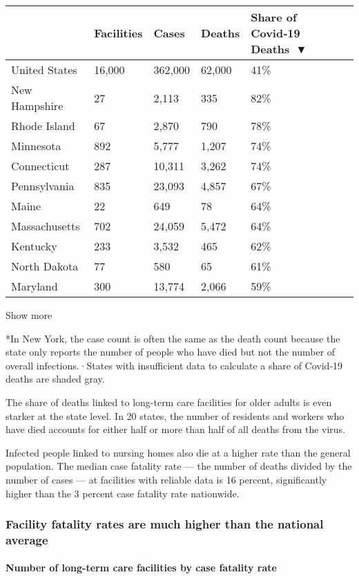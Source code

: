 \begin{longtable}[]{@{}lllll@{}}
\toprule
& Facilities & Cases & Deaths & Share of Covid‑19
Deaths~▼\tabularnewline
\midrule
\endhead
United States & 16,000 & 362,000 & 62,000 & 41\%\tabularnewline
New Hampshire & 27 & 2,113 & 335 & 82\%\tabularnewline
Rhode Island & 67 & 2,870 & 790 & 78\%\tabularnewline
Minnesota & 892 & 5,777 & 1,207 & 74\%\tabularnewline
Connecticut & 287 & 10,311 & 3,262 & 74\%\tabularnewline
Pennsylvania & 835 & 23,093 & 4,857 & 67\%\tabularnewline
Maine & 22 & 649 & 78 & 64\%\tabularnewline
Massachusetts & 702 & 24,059 & 5,472 & 64\%\tabularnewline
Kentucky & 233 & 3,532 & 465 & 62\%\tabularnewline
North Dakota & 77 & 580 & 65 & 61\%\tabularnewline
Maryland & 300 & 13,774 & 2,066 & 59\%\tabularnewline
\bottomrule
\end{longtable}

Show more

*In New York, the case count is often the same as the death count
because the state only reports the number of people who have died but
not the number of overall infections.·States with insufficient data to
calculate a share of Covid-19 deaths are shaded gray.

The share of deaths linked to long-term care facilities for older adults
is even starker at the state level. In 20 states, the number of
residents and workers who have died accounts for either half or more
than half of all deaths from the virus.

Infected people linked to nursing homes also die at a higher rate than
the general population. The median case fatality rate --- the number of
deaths divided by the number of cases --- at facilities with reliable
data is 16 percent, significantly higher than the 3 percent case
fatality rate nationwide.

\hypertarget{facility-fatality-rates-are-much-higher-than-the-national-average}{%
\subsubsection{Facility fatality rates are much higher than the national
average}\label{facility-fatality-rates-are-much-higher-than-the-national-average}}

\hypertarget{number-of-long-term-care-facilities-by-case-fatality-rate}{%
\paragraph{Number of long-term care facilities by case fatality
rate}\label{number-of-long-term-care-facilities-by-case-fatality-rate}}

